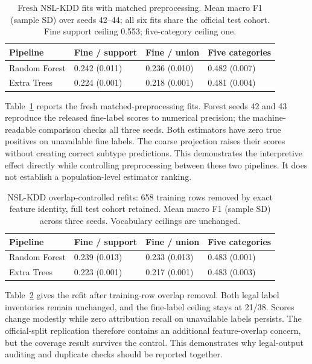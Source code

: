 \documentclass[twocolumn]{svjour3}
\begin{document}
\begin{table}[t]
\caption{Fresh NSL-KDD fits with matched preprocessing. Mean macro F1 (sample SD) over seeds 42--44; all six fits share the official test cohort. Fine support ceiling 0.553; five-category ceiling one.}\label{tab-nsl}
\centering\small
\begin{tabular}{llll}\toprule
Pipeline & Fine / support & Fine / union & Five categories\\
\midrule
Random Forest & 0.242 (0.011) & 0.236 (0.010) & 0.482 (0.007)\\
Extra Trees & 0.224 (0.001) & 0.218 (0.001) & 0.481 (0.004)\\
\bottomrule\end{tabular}
\end{table}


Table~\ref{tab-nsl} reports the fresh matched-preprocessing fits. Forest seeds 42 and 43 reproduce the released fine-label scores to numerical precision; the machine-readable comparison checks all three seeds. Both estimators have zero true positives on unavailable fine labels. The coarse projection raises their scores without creating correct subtype predictions. This demonstrates the interpretive effect directly while controlling preprocessing between these two pipelines. It does not establish a population-level estimator ranking.

\begin{table}[t]
\caption{NSL-KDD overlap-controlled refits: 658 training rows removed by exact feature identity, full test cohort retained. Mean macro F1 (sample SD) across three seeds. Vocabulary ceilings are unchanged.}\label{tab-overlap}
\centering\small
\begin{tabular}{llll}\toprule
Pipeline & Fine / support & Fine / union & Five categories\\
\midrule
Random Forest & 0.239 (0.013) & 0.233 (0.013) & 0.483 (0.001)\\
Extra Trees & 0.223 (0.001) & 0.217 (0.001) & 0.483 (0.003)\\
\bottomrule\end{tabular}
\end{table}


Table~\ref{tab-overlap} gives the refit after training-row overlap removal. Both legal label inventories remain unchanged, and the fine-label ceiling stays at 21/38. Scores change modestly while zero attribution recall on unavailable labels persists. The official-split replication therefore contains an additional feature-overlap concern, but the coverage result survives the control. This demonstrates why legal-output auditing and duplicate checks should be reported together.
\end{document}

